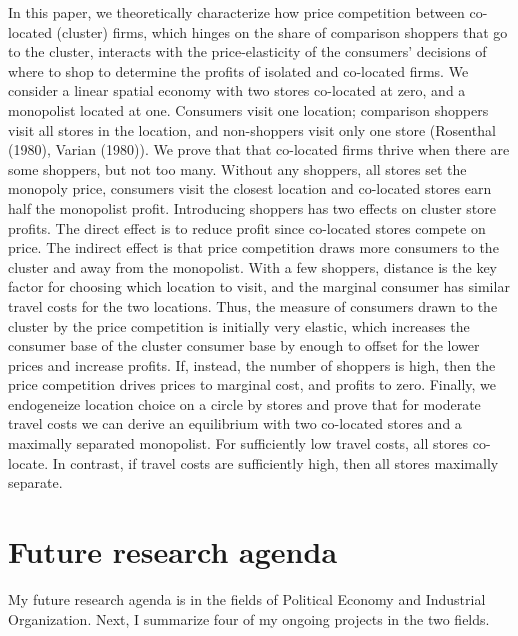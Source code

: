 \documentclass[12pt]{article}
\begin{document}
\noindent
In this paper, we theoretically characterize how price competition between co-located (cluster) firms, which hinges on the share of comparison shoppers that go to the cluster,
interacts with the price-elasticity of the consumers' decisions of where to shop to determine the  profits of  isolated and co-located firms.
We consider a linear spatial economy with two stores co-located at zero, and a monopolist located at one.
Consumers visit one location; comparison shoppers visit all stores in the location, and non-shoppers visit only one store (Rosenthal (1980), Varian (1980)).
We prove that that co-located firms thrive when there are some shoppers, but not too many.
Without any shoppers, all stores set the monopoly price, consumers visit the closest location and co-located stores earn half the monopolist profit.
Introducing shoppers has two effects on cluster store profits.
The direct effect is to reduce profit since co-located stores compete on price.
The indirect effect is that price competition draws more consumers to the cluster and away from the monopolist.
With a few shoppers, distance is the key factor for choosing which location to visit, and the marginal consumer has similar travel costs for the two locations.
Thus, the measure of consumers drawn to the cluster by the price competition is initially very elastic, which increases the consumer base of the cluster consumer base by enough to offset for the lower prices and increase profits.
If, instead, the number of shoppers is high, then the price competition drives prices to marginal cost, and profits to zero.
Finally, we endogeneize location choice on a circle by stores and prove that for moderate travel costs we can derive an equilibrium with two co-located stores and a maximally separated monopolist.
For sufficiently low travel costs, all stores co-locate.
In contrast, if travel costs are sufficiently high, then all stores maximally separate.

\vspace{0.25cm}

\section{Future research agenda}
\label{sec:org746050d}

My future research agenda is in the fields of Political Economy and Industrial Organization.
Next, I summarize four of my ongoing projects in the two fields.
\end{document}
